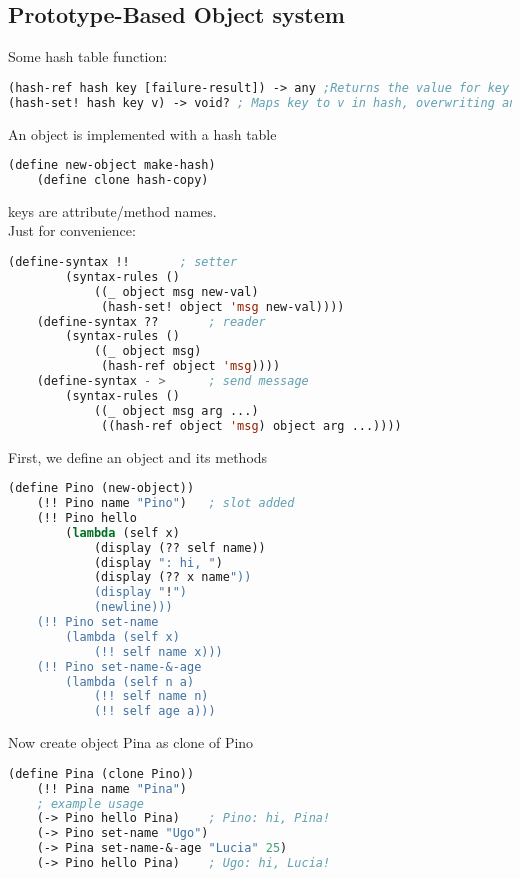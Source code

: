 \subsection{Prototype-Based Object system}
Some hash table function:
\begin{lstlisting}[language=Lisp]
(hash-ref hash key [failure-result]) -> any ;Returns the value for key in hash. If no value is found for key, then failure-result determines the result
(hash-set! hash key v) -> void? ; Maps key to v in hash, overwriting any existing mapping for key.
\end{lstlisting}

An object is implemented with a hash table

\begin{lstlisting}[language=Lisp]
    (define new-object make-hash)
    (define clone hash-copy)
\end{lstlisting}
keys are attribute/method names. \\
Just for convenience:
\begin{lstlisting}[language=Lisp]
    (define-syntax !!       ; setter
        (syntax-rules ()
            ((_ object msg new-val)
             (hash-set! object 'msg new-val))))
    (define-syntax ??       ; reader
        (syntax-rules ()
            ((_ object msg)
             (hash-ref object 'msg))))
    (define-syntax - >      ; send message
        (syntax-rules ()
            ((_ object msg arg ...)
             ((hash-ref object 'msg) object arg ...))))
\end{lstlisting}
First, we define an object and its methods
\begin{lstlisting}[language=Lisp]
    (define Pino (new-object))
    (!! Pino name "Pino")   ; slot added
    (!! Pino hello 
        (lambda (self x)
            (display (?? self name))
            (display ": hi, ")
            (display (?? x name"))
            (display "!")
            (newline)))
    (!! Pino set-name
        (lambda (self x)
            (!! self name x)))
    (!! Pino set-name-&-age
        (lambda (self n a)
            (!! self name n)
            (!! self age a)))
\end{lstlisting}
Now create object Pina as clone of Pino
\begin{lstlisting}[language=Lisp]
    (define Pina (clone Pino))
    (!! Pina name "Pina")
    ; example usage
    (-> Pino hello Pina)    ; Pino: hi, Pina!
    (-> Pino set-name "Ugo")
    (-> Pina set-name-&-age "Lucia" 25)
    (-> Pino hello Pina)    ; Ugo: hi, Lucia!
\end{lstlisting}


